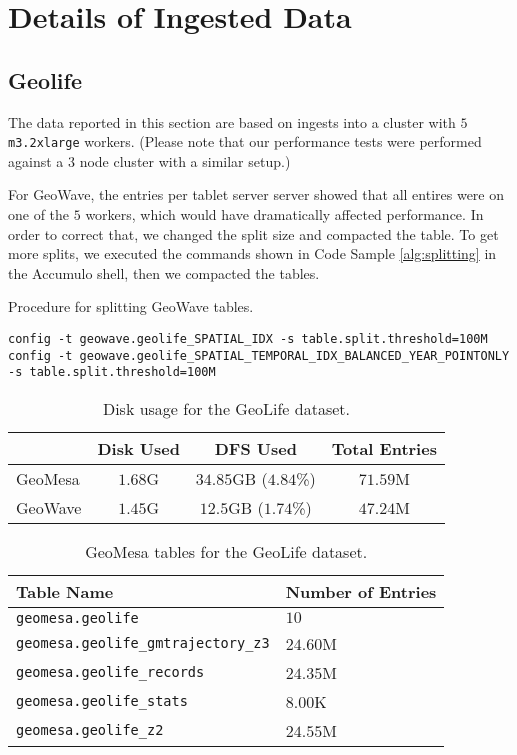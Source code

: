 \section{Details of Ingested Data}
\label{appendix:data}

\subsection{Geolife}

The data reported in this section are based on ingests into a cluster with $5$ \texttt{m3.2xlarge} workers.
(Please note that our performance tests were performed against a $3$ node cluster with a similar setup.)

For GeoWave, the entries per tablet server server showed that all entires were on one of the $5$ workers, which would have dramatically affected performance.
In order to correct that, we changed the split size and compacted the table.
To get more splits, we executed the commands shown in Code Sample \ref{alg:splitting} in the Accumulo shell, then we compacted the tables.

\begin{algorithm}[htb]
\caption{Procedure for splitting GeoWave tables.}\label{alg:splitting}
{\footnotesize\begin{lstlisting}
config -t geowave.geolife_SPATIAL_IDX -s table.split.threshold=100M
config -t geowave.geolife_SPATIAL_TEMPORAL_IDX_BALANCED_YEAR_POINTONLY -s table.split.threshold=100M
\end{lstlisting}}
\end{algorithm}

\begin{table}[h!tb]
  \centering
  \begin{tabular}{ | l || c | c | c | }
    \hline
    & Disk Used & DFS Used & Total Entries \\
    \hline
    GeoMesa & $1.68$G & $34.85$GB ($4.84$\%) & $71.59$M \\
    GeoWave & $1.45$G & $12.5$GB ($1.74$\%) & $47.24$M \\
    \hline
  \end{tabular}
  \caption{Disk usage for the GeoLife dataset.}
  \label{table:geolife:disk}
\end{table}

\begin{table}[h!tb]
  \centering
  \begin{tabular}{ | l | l | }
    \hline
    Table Name & Number of Entries \\
    \hline
    \texttt{geomesa.geolife} & $10$ \\
    \texttt{geomesa.geolife\_gmtrajectory\_z3} & $24.60$M \\
    \texttt{geomesa.geolife\_records} & $24.35$M \\
    \texttt{geomesa.geolife\_stats} & $8.00$K \\
    \texttt{geomesa.geolife\_z2} & $24.55$M \\
    \hline
  \end{tabular}
  \caption{GeoMesa tables for the GeoLife dataset.}
  \label{table:geolife:geomesa:tables}
\end{table}

